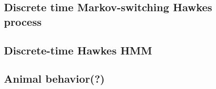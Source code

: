 \subsection*{Discrete time Markov-switching Hawkes process} 

\subsection{Discrete-time Hawkes HMM} 

\subsection{Animal behavior(?)}


